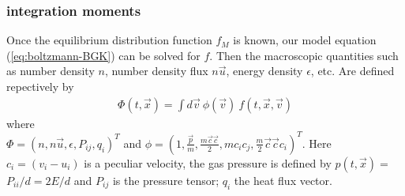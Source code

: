 \begin{frame} \frametitle{integration moments}
	Once the equilibrium distribution function $f_M$ is known, our model equation (\ref{eq:boltzmann-BGK}) can be solved for $f$. Then the macroscopic quantities such as number density $n$, number density flux $n\vec{u}$, energy density $\epsilon$, etc. Are defined repectively by 
	\begin{align}
	\Phi(t,\vec{x}) = \int d\vec{v} \ \phi(\vec{v}) \ f(t,\vec{x},\vec{v})
	\end{align}
	where \\ $\Phi = (n ,n\vec{u},\epsilon,P_{ij},q_{i})^T$ and $\phi = (1,\frac{\vec{p}}{m}, \frac{m\vec{c}\vec{c}}{2},mc_ic_j,\frac{m}{2}\vec{c}\vec{c}c_i)^T$. Here $c_i = (v_i-u_i)$ is a peculiar velocity, the gas pressure is defined by $p(t,\vec{x}) =$ $P_{ii}/d = 2E/d$ and $P_{ij}$ is the pressure tensor; $q_i$ the heat flux vector.
\end{frame}